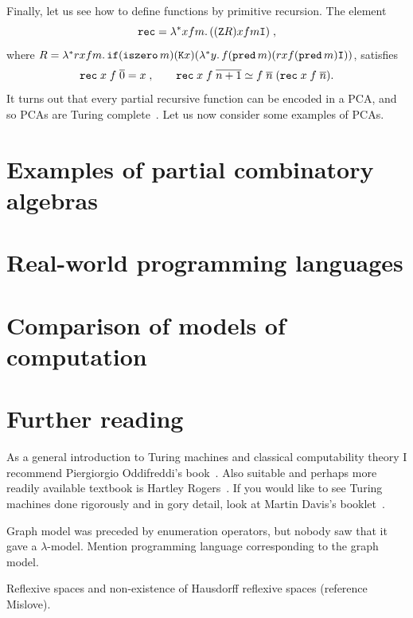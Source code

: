 Finally, let us see how to define functions by primitive recursion.
%
%
%
The element
%
\begin{equation*}
  \mathtt{rec} = \lambda^{*} x f m .\,((\mathtt{Z} R) x f m \mathtt{I}) \;,
\end{equation*}
%
where $R = \lambda^{*} r x f m .\,\mathtt{if} (\mathtt{iszero}\, m) (\mathtt{K} x)
  (\lambda^{*} y .\,f (\mathtt{pred}\, m)(r x f (\mathtt{pred}\, m)
    \mathtt{I}))$, satisfies
%
\begin{equation*}
  \mathtt{rec}\; x\; f\; \overline{0} = x \;,\qquad
  \mathtt{rec}\; x\; f\; \overline{n+1} \simeq
    f\; \overline{n}\; (\mathtt{rec}\; x\; f\; \overline{n}).
\end{equation*}
%
It turns out that every partial recursive function can be encoded in a
PCA, and so PCAs are Turing complete~\cite[VI.2.8]{Beeson:85}. Let us
now consider some examples of PCAs.


\section{Examples of partial combinatory algebras}
\label{sec:pca-examples}




\section{Real-world programming languages}
\label{sec:programming-languages}


\section{Comparison of models of computation}
\label{sec:models-comparison}



\section{Further reading}
\label{sec:models-further-reading}

As a general introduction to Turing machines and classical
computability theory I recommend Piergiorgio Oddifreddi's
book~\cite{Oddifreddi}. Also suitable and perhaps more readily
available textbook is Hartley Rogers~\cite{Rogers}. If you would like
to see Turing machines done rigorously and in gory detail, look at
Martin Davis's booklet~\cite{Davis}.


Graph model was preceded by enumeration operators, but nobody saw that
it gave a $\lambda$-model. Mention programming language corresponding
to the graph model.

Reflexive spaces and non-existence of Hausdorff reflexive spaces
(reference Mislove).


